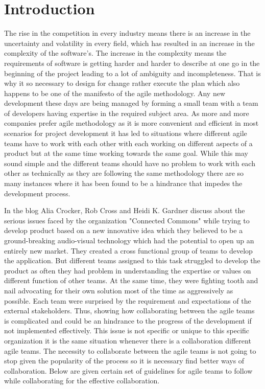 \documentclass[sigconf]{acmart}
\begin{document}
\section{Introduction}
The rise in the competition in every industry means there is an increase in the uncertainty and volatility in every field, which has resulted in an increase in the complexity of the software's. The increase in the complexity means the requirements of software is getting harder and harder to describe at one go in the beginning of the project leading to a lot of ambiguity and incompleteness. That is why it so necessary to design for change rather execute the plan which also happens to be one of the manifesto of the agile methodology. Any new development these days are being managed by forming a small team with a team of developers having expertise in the required subject area. As more and more companies prefer agile methodology as it is more convenient and efficient in most scenarios for project development it has led to situations where different agile teams have to work with each other with each working on different aspects of a product but at the same time working towards the same goal. While this may sound simple and the different teams should have no problem to work with each other as technically as they are following the same methodology there are so many instances where it has been found to be a hindrance that impedes the development process.

In the blog \cite{Alia01} Alia Crocker, Rob Cross and Heidi K. Gardner discuss about the serious issues faced by the organization "Connected Commons" while trying to develop product based on a new innovative idea which they believed to be a ground-breaking audio-visual technology which had the potential to open up an entirely new market. They created a cross functional group of teams to develop the application. But different teams assigned to this task struggled to develop the product as often they had problem in understanding the expertise or values on different function of other teams. At the same time, they were fighting tooth and nail advocating for their own solution most of the time as aggressively as possible. Each team were surprised by the requirement and expectations of the external stakeholders. Thus, showing how collaborating between the agile teams is complicated and could be an hindrance to the progress of the development if not implemented effectively. This issue is not specific or unique to this specific organization it is the same situation whenever there is a collaboration different agile teams. The necessity to collaborate between the agile teams is not going to stop given the popularity of the process so it is necessary find better ways of collaboration. Below are given certain set of guidelines for agile teams to follow while collaborating for the effective collaboration.
\end{document}
